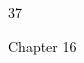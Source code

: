 \documentclass[12pt]{article}
\begin{document}
\vspace{\baselineskip}

\vspace{\baselineskip}

\vspace{\baselineskip}

\vspace{\baselineskip}

\vspace{\baselineskip}

\vspace{\baselineskip}

\vspace{\baselineskip}

\vspace{\baselineskip}

\vspace{\baselineskip}

\vspace{\baselineskip}

\vspace{\baselineskip}

\vspace{\baselineskip}

\vspace{\baselineskip}

\vspace{\baselineskip}

\vspace{\baselineskip}

\vspace{\baselineskip}

\vspace{\baselineskip}

\vspace{\baselineskip}

\vspace{\baselineskip}

\vspace{\baselineskip}

\vspace{\baselineskip}

\vspace{\baselineskip}
\begin{Center}
\textcolor[HTML]{00000A}{37}
\end{Center}\par


\vspace{\baselineskip}
{\fontsize{14pt}{16.8pt}\selectfont \textcolor[HTML]{00000A}{Chapter 16}\par}\par
\end{document}
